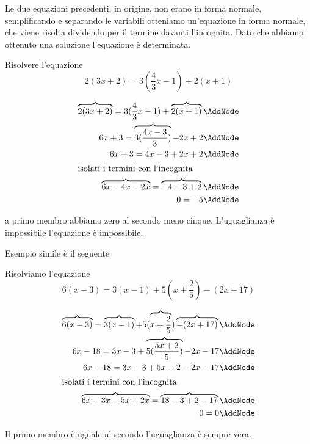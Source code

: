  Le due equazioni precedenti, in origine, non erano in forma normale, semplificando e separando le variabili otteniamo un'equazione in forma normale,  che viene risolta dividendo per il termine davanti l'incognita. Dato che abbiamo ottenuto una soluzione l'equazione è determinata.
\begin{esempiot}{}{}
Risolvere l'equazione \[2(3x+2)=3(\dfrac{4}{3}x-1)+2(x+1) \]
\end{esempiot}
 \begin{NodesList}[margin=3cm]
  \begin{align*}
\overbrace{2(3x+2)}=3(\dfrac{4}{3}x-1)+\overbrace{2(x+1)} \AddNode\\
6x+3=\overbrace{3(\dfrac{4x-3}{3})}+2x+2 \AddNode\\
 6x+3=4x-3+2x+2  \AddNode\\
  \intertext{\hfil isolati i termini con l'incognita \hfil}
 \overbrace{6x-4x-2x}=\overbrace{-4-3+2}  \AddNode\\
 0=-5\AddNode
  \end{align*}
  \end{NodesList}
  a  primo membro abbiamo zero al secondo meno cinque. L'uguaglianza è impossibile l'equazione è impossibile.

Esempio simile è il seguente
\begin{esempiot}{}{}
Risolviamo l'equazione \[ 6(x-3) = 3(x-1)+5(x+\dfrac{2}{5})-(2x+17)\]
\end{esempiot}
\begin{NodesList}[margin=3cm]
  \begin{align*}
\overbrace{6(x-3)} = \overbrace{3(x-1)}+5(\overbrace{x+\dfrac{2}{5}})\overbrace{-(2x+17)} \AddNode\\
6x-18 = 3x-3+\overbrace{5(\dfrac{5x+2}{5})}-2x-17\AddNode\\
6x-18 = 3x-3+5x+2-2x-17  \AddNode\\
  \intertext{\hfil isolati i termini con l'incognita \hfil}
 \overbrace{6x-3x-5x+2x}=\overbrace{18-3+2-17}  \AddNode\\
 0=0\AddNode
  \end{align*}
  \end{NodesList}
  Il primo membro è uguale al secondo l'uguaglianza è sempre vera. 

